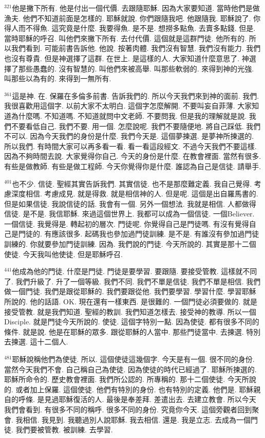 \documentclass{book}
\begin{document}
$^{321}$他是撇下所有.
他是付出一個代價.
去跟隨耶穌.
因為大家要知道.
當時他們是做漁夫.
他們不知道前面是怎樣的.
耶穌就說.
你們跟隨我吧.
他跟隨我.
耶穌說了.
你得人而不得魚.
這究竟是什麼.
我要得魚.
是不是.
想撈多點魚.
去賣多點錢.
但是.
當時耶穌的呼召.
叫他們來撇下所有.
去付代價.
這個就是這群門徒.
他所有的.
所以我們看到.
可能前書告訴他.
他說.
按著肉體.
我們沒有智慧.
我們沒有能力.
我們也沒有尊貴.
但是神選擇了這群.
在世上.
是這樣的人.
大家知道什麼意思了.
神選擇了那些愚蠢的.
沒有智慧的.
叫他們來被高舉.
叫那些軟弱的.
來得到神的光強.
叫那些以為有的.
來得到一無所有.

$^{361}$這是神.
在.
保羅在多倫多前書.
告訴我們的.
所以今天我們來到神的面前.
我們.
我很喜歡用這個字.
以前大家不太明白.
這個字怎麼解開.
不要叫妄自菲薄.
大家知道為什麼嗎.
不知道嗎.
不知道就問中文老師.
不要問我.
但是我的理解就是說.
我們不要看低自己.
我們不要.
用一個.
怎麼說呢.
我們不要隨便地.
將自己踩低.
我們不可以.
因為今天我們的身份是什麼.
我們今天是.
這個夢揀選.
是夢神所揀選的.
所以我們.
有時間大家可以再多看一看.
看一看這段經文.
不過今天我們不要這樣.
因為不夠時間去說.
大家覺得你自己.
今天的身份是什麼.
在教會裡面.
當然有很多.
有些是做教師.
有些是做工程師.
今天你覺得你是什麼.
誰認為自己是信徒.
請舉手.

$^{401}$也不少.
信徒.
聖經其實告訴我們.
其實信徒.
也不是那麼難定義.
我自己覺得.
考慮深度相信.
考慮成見.
就是得救.
就是相信神的人.
但是呢.
這個是出自羅馬書的.
但是如果信徒.
我說信徒的話.
我會有一個.
另外一個想法.
我就是相信.
人都做得信徒.
是不是.
我信耶穌.
來過這個世界上.
我都可以成為一個信徒.
一個Believer.
一個信徒.
我覺得是.
轉起初的層次.
門徒呢.
你覺得自己是門徒嗎.
有沒有覺得自己是門徒的.
有應該很多.
起碼我也參加過門徒訓練.
是不是.
有誰沒有參加過門徒訓練的.
你就要參加門徒訓練.
因為.
我們說的門徒.
今天所說的.
其實是那十二個使徒.
今天我叫他使徒.
但是耶穌呼召.

$^{441}$他成為他的門徒.
什麼是門徒.
門徒是要學習.
要跟隨.
要接受管教.
這樣就不同了.
我們升級了.
升了一個等級.
我們不同.
我們不單是信徒.
我們不單是相信.
我們做一個門徒.
我們是跟從耶穌的.
我們要跟從他.
我們要學習.
學習什麼.
學習耶穌所說的.
他的話語.
OK.
現在還有一樣東西.
是很難的.
一個門徒必須要做的.
就是接受管教.
就是我們知道.
聖經的教訓.
我們知道怎樣去.
接受神的教導.
所以一個Disciple.
就是門徒今天所說的.
使徒.
這個字特別一點.
因為使徒.
都有很多不同的條件.
就是說.
他是在耶穌的眾多.
跟從耶穌的人當中.
那些門徒當中.
去揀選.
特別去揀選.
這十二個人.

$^{481}$耶穌說稱他們為使徒.
所以.
這個使徒這幾個字.
今天是有一個.
很不同的身份.
當然今天我們不會.
自己稱自己為使徒.
因為使徒的時代已經過了.
耶穌所揀選的.
耶穌所命令的.
歷史教會裡面.
我們所公認的.
所專稱的.
那十二個使徒.
今天所說的.
或者加上保羅.
這個使徒.
他們有特別的身份.
也有特別的定義.
他們是.
耶穌親自的呼條.
是見過耶穌復活的人.
最後是奉差拜.
差遣出去.
去建立教會.
所以今天我們會看到.
有很多不同的稱呼.
很多不同的身份.
究竟你今天.
這個旁觀者回到聚會.
我相信.
我見到.
我聽過別人說耶穌.
我去相信.
還是.
我是立志.
去成為一個門徒.
我們要被管教.
被訓練.
去學習.
\end{document}
